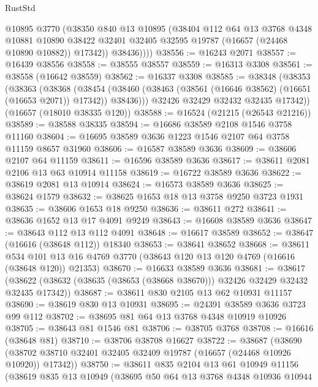 \begin{lexlean}{RustStd}
\begin{coremodule}
            @10895
            @3770
            (@38350
              @840
              @13
              @10895
              (@38404
                @112
                @64
                @13
                @3768
                @4348
                @10881
                @10890
                @38422
                @32401
                @32405
                @32595
                @19787
                (@16657 (@24468 @10890 @10882))
                @17342))
            @38436))))
@38556 := @16243 @2071
@38557 := @16439 @38556
@38558 := @38555 @38557
@38559 := @16313 @3308
@38561 := @38558 (@16642 @38559)
@38562 := @16337 @3308
@38585 := @38348
    (@38353
      (@38363
        (@38368
          (@38454 (@38460 (@38463 (@38561 (@16646 @38562) (@16651 (@16653 @2071)) @17342)) @38436)))
        @32426
        @32429
        @32432
        @32435
        @17342))
    (@16657 (@18010 @38335 @120))
@38588 := @16524 (@21215 (@26543 @21216))
@38589 := @38588 @38335
@38594 := @16686 @38589 @2108 @1546 @3758 @11160
@38604 := @16695 @38589 @3636 @1223 @1546 @2107 @64 @3758 @11159 @8657 @31960
@38606 := @16587 @38589 @3636
@38609 := @38606 @2107 @64 @11159
@38611 := @16596 @38589 @3636
@38617 := @38611 @2081 @2106 @13 @63 @10914 @11158
@38619 := @16722 @38589 @3636
@38622 := @38619 @2081 @13 @10914
@38624 := @16573 @38589 @3636
@38625 := @38624 @1579
@38632 := @38625 @1653 @18 @13 @3758 @9250 @3723 @1931
@38635 := @38606 @1653 @18 @9250
@38636 := @38611 @272
@38641 := @38636 @1652 @13 @17 @4091 @9249
@38643 := @16608 @38589 @3636
@38647 := @38643 @112 @13 @112 @4091
@38648 := @16617 @38589
@38652 := @38647 (@16616 (@38648 @112)) @18340
@38653 := @38641 @38652
@38668 := @38611
    @534
    @101
    @13
    @16
    @4769
    @3770
    (@38643 @120 @13 @120 @4769 (@16616 (@38648 @120)) @21353)
@38670 := @16633 @38589 @3636
@38681 := @38617
    (@38622 (@38632 (@38635 (@38653 (@38668 @38670))) @32426 @32429 @32432 @32435 @17342))
@38687 := @38611 @830 @2105 @13 @62 @10931 @11157
@38690 := @38619 @830 @13 @10931
@38695 := @24391 @38589 @3636 @3723 @99 @112
@38702 := @38695 @81 @64 @13 @3768 @4348 @10919 @10926
@38705 := @38643 @81 @1546 @81
@38706 := @38705 @3768
@38708 := @16616 (@38648 @81)
@38710 := @38706 @38708 @16627
@38722 := @38687
    (@38690 (@38702 @38710 @32401 @32405 @32409 @19787 (@16657 (@24468 @10926 @10920)) @17342))
@38750 := @38611
    @835
    @2104
    @13
    @61
    @10949
    @11156
    (@38619
      @835
      @13
      @10949
      (@38695
        @50
        @64
        @13
        @3768
        @4348
        @10936
        @10944

\end{coremodule}
\end{lexlean}
